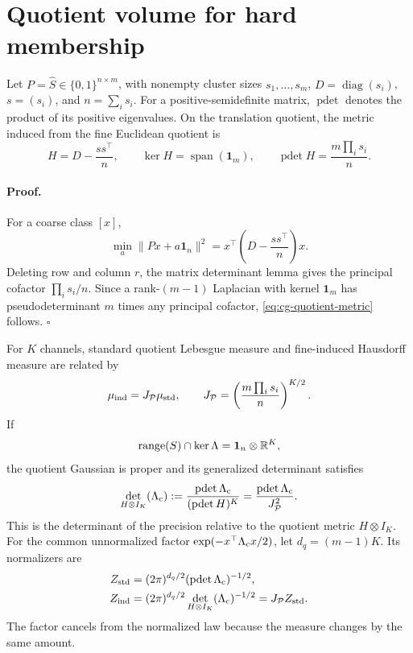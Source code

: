 \section{Quotient volume for hard membership}
\label{sec:cg-quotient-volume}

Let \(P=\widehat S\in\{0,1\}^{n\times m}\), with nonempty cluster sizes
\(s_1,\ldots,s_m\), \(D=\operatorname{diag}(s_i)\),
\(s=(s_i)\), and \(n=\sum_i s_i\). For a positive-semidefinite matrix,
\(\operatorname{pdet}\) denotes the product of its positive eigenvalues.
On the translation quotient, the metric
induced from the fine Euclidean quotient is
\begin{equation}
H=D-\frac{ss^\top}{n},\qquad
\ker H=\operatorname{span}(\mathbf1_m),\qquad
\operatorname{pdet}H=\frac{m\prod_i s_i}{n}.
\label{eq:cg-quotient-metric}
\end{equation}

\paragraph{Proof.}
For a coarse class \([x]\),
\[
\min_a\|Px+a\mathbf1_n\|^2
=x^\top\left(D-\frac{ss^\top}{n}\right)x.
\]
Deleting row and column \(r\), the matrix determinant lemma gives the
principal cofactor \(\prod_i s_i/n\). Since a rank-\((m-1)\) Laplacian with
kernel \(\mathbf1_m\) has pseudodeterminant \(m\) times any principal
cofactor, \eqref{eq:cg-quotient-metric} follows. \(\square\)

For \(K\) channels, standard quotient Lebesgue measure and fine-induced
Hausdorff measure are related by
\begin{equation}
\mu_{\rm ind}=J_{\mathcal P}\mu_{\rm std},\qquad
J_{\mathcal P}
=\left(\frac{m\prod_i s_i}{n}\right)^{K/2}.
\label{eq:cg-quotient-jacobian}
\end{equation}
If
\[
\operatorname{range}(S)\cap\ker\Lambda
=\mathbf1_n\otimes\mathbb R^K,
\]
the quotient Gaussian is proper and its generalized determinant satisfies
\begin{equation}
\det_{H\otimes I_K}(\Lambda_{\rm c})
:=\frac{\operatorname{pdet}\Lambda_{\rm c}}
{(\operatorname{pdet}H)^K}
=\frac{\operatorname{pdet}\Lambda_{\rm c}}{J_{\mathcal P}^2}.
\label{eq:cg-quotient-generalized-determinant}
\end{equation}
This is the determinant of the precision relative to the quotient metric
\(H\otimes I_K\). For the common unnormalized factor
\(\exp(-x^\top\Lambda_{\rm c}x/2)\), let \(d_q=(m-1)K\). Its normalizers are
\begin{equation}
\begin{aligned}
Z_{\rm std}
&=(2\pi)^{d_q/2}
(\operatorname{pdet}\Lambda_{\rm c})^{-1/2},\\
Z_{\rm ind}
&=(2\pi)^{d_q/2}
\det_{H\otimes I_K}(\Lambda_{\rm c})^{-1/2}
=J_{\mathcal P}Z_{\rm std}.
\end{aligned}
\label{eq:cg-quotient-normalizers}
\end{equation}
The factor cancels from the normalized law because the measure changes by
the same amount. 

